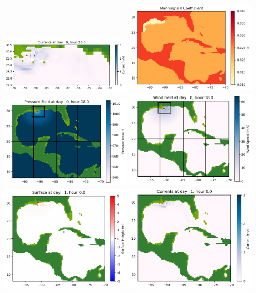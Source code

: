\documentclass[11pt]{article}
\begin{document}
\includegraphics[width=0.475\textwidth]{frame0011fig1004.png}
\vskip 10pt 
\includegraphics[width=0.475\textwidth]{frame0011fig1005.png}
\includegraphics[width=0.475\textwidth]{frame0011fig1006.png}
\vskip 10pt 
\includegraphics[width=0.475\textwidth]{frame0011fig1007.png}
\vskip 10pt 
\includegraphics[width=0.475\textwidth]{frame0012fig1001.png}
\includegraphics[width=0.475\textwidth]{frame0012fig1002.png}
\end{document}
